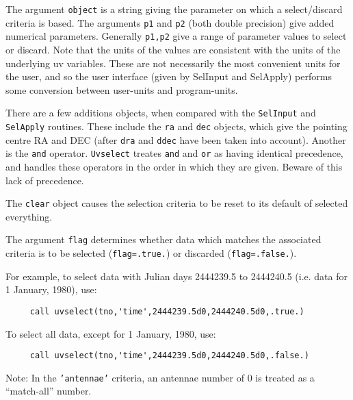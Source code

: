 \documentclass{report}
\begin{document}
The argument {\tt object} is a string giving the parameter on which a
select/discard criteria is based. The
arguments {\tt p1} and {\tt p2} (both double precision) give
added numerical parameters. Generally {\tt p1,p2} give a range of
parameter values to select or discard. Note that the units of the values are
consistent with the units of the underlying uv variables. These are not
necessarily the most convenient units for the user, and so the user
interface (given by SelInput and SelApply) performs some conversion
between user-units and program-units.

There are a few additions objects, when compared with the {\tt SelInput}
and {\tt SelApply}
routines. These include the {\tt ra} and {\tt dec} objects, which give the
pointing centre RA and DEC (after {\tt dra} and {\tt ddec} have been taken
into account). Another is the {\tt and} operator. {\tt Uvselect} treates
{\tt and} and {\tt or} as having identical precedence, and handles these
operators in the order in which they are given. Beware of this lack of
precedence.

The {\tt clear} object causes the selection criteria to be reset to its
default of selected everything.

The argument {\tt flag} determines
whether data which matches the associated criteria is to be selected
({\tt flag=.true.}) or discarded ({\tt flag=.false.}).

For example, to select data with Julian days 2444239.5 to 2444240.5 (i.e.
data for 1 January, 1980), use:
\begin{verbatim}
     call uvselect(tno,'time',2444239.5d0,2444240.5d0,.true.)
\end{verbatim}
To select all data, except for 1 January, 1980, use:
\begin{verbatim}
     call uvselect(tno,'time',2444239.5d0,2444240.5d0,.false.)
\end{verbatim}
Note: In the {\tt 'antennae'} criteria, an antennae number of 0 is treated
as a ``match-all'' number.
\end{document}

